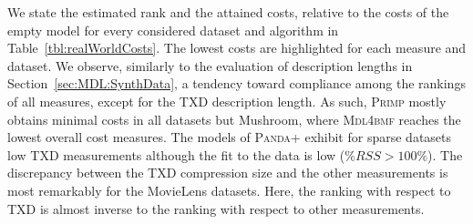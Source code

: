 We state the estimated rank and the attained costs, relative to the costs of the empty model for every considered dataset and algorithm in Table~\ref{tbl:realWorldCosts}. The lowest costs are highlighted for each measure and dataset. We observe, similarly to the evaluation of description lengths in Section~\ref{sec:MDL:SynthData}, a tendency toward compliance among the rankings of all measures, except for the TXD description length. 
As such, \textsc{Primp} mostly obtains minimal costs in all datasets but Mushroom, where \textsc{Mdl4bmf} reaches the lowest overall cost measures. The models of \textsc{Panda+} exhibit for sparse datasets low TXD measurements although the fit to the data is low ($\%RSS>100\%$). The discrepancy between the TXD compression size and the other measurements is most remarkably for the MovieLens datasets. Here, the ranking with respect to TXD is  almost inverse to the ranking with respect to other measurements.

